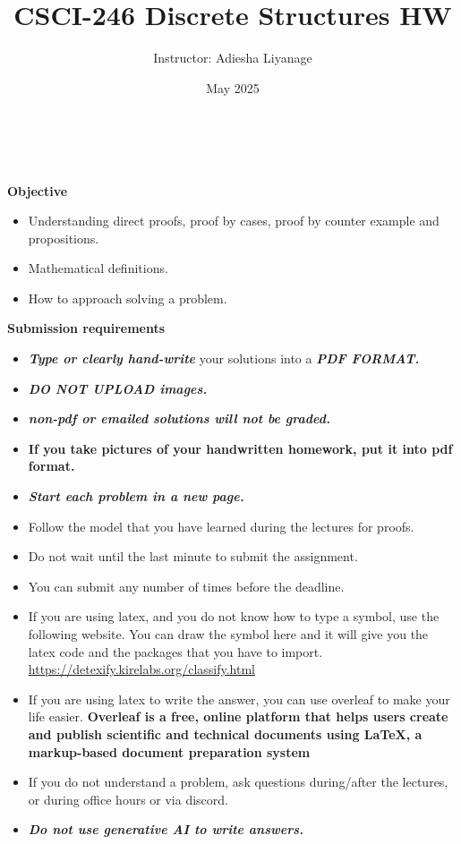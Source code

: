\documentclass[12pt]{exam}
\title{CSCI-246 Discrete Structures HW \assignmentnumber}
\author{Instructor: Adiesha Liyanage}
\date{May 2025}
\begin{document}
\maketitle

\hrulefill
\\
\\
\textbf{Objective}
\begin{itemize}
    \item Understanding direct proofs, proof by cases, proof by counter example and propositions.
    \item Mathematical definitions.
    \item How to approach solving a problem.
\end{itemize}

\textbf{Submission requirements}
\begin{itemize}
    \item \textbf{\textit{Type or clearly hand-write}} your solutions into a \textbf{\textit{PDF FORMAT.}} 
    \item \textbf{\textit{DO NOT UPLOAD images.}}
    \item \textbf{\textit{non-pdf or emailed solutions will not be graded.}}
    \item \textbf{If you take pictures of your handwritten homework, put it into pdf format.}
    \item \textbf{\textit{Start each problem in a new page.}}
    \item Follow the model that you have learned during the lectures for proofs.
    \item Do not wait until the last minute to submit the assignment.
    \item You can submit any number of times before the deadline. 
    \item If you are using latex, and you do not know how to type a symbol, use the following website. You can draw the symbol here and it will give you the latex code and the packages that you have to import. \url{https://detexify.kirelabs.org/classify.html}
    \item If you are using latex to write the answer, you can use overleaf to make your life easier. \textbf{Overleaf is a free, online platform that helps users create and publish scientific and technical documents using LaTeX, a markup-based document preparation system}
    \item If you do not understand a problem, ask questions during/after the lectures, or during office hours or via discord.
    \item \textbf{\textit{Do not use generative AI to write answers.}} 
\end{itemize}
\end{document}
